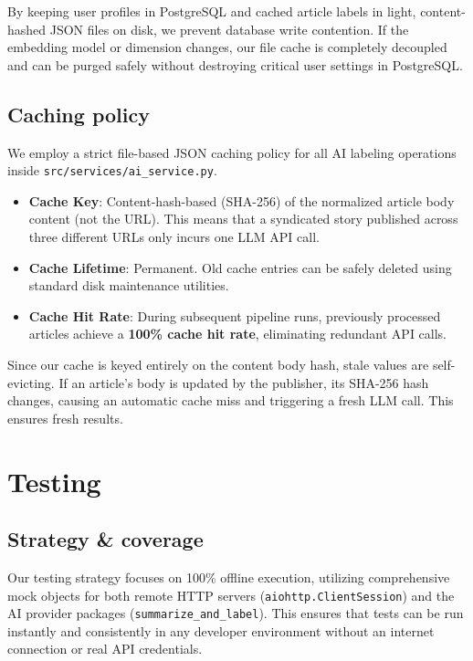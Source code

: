 \documentclass[11pt,a4paper]{article}
\begin{document}
By keeping user profiles in PostgreSQL and cached article labels in light, content-hashed JSON files on disk, we prevent database write contention. If the embedding model or dimension changes, our file cache is completely decoupled and can be purged safely without destroying critical user settings in PostgreSQL.

\subsection{Caching policy}

We employ a strict file-based JSON caching policy for all AI labeling operations inside \texttt{src/services/ai\_service.py}.
\begin{itemize}
    \item \textbf{Cache Key}: Content-hash-based (SHA-256) of the normalized article body content (not the URL). This means that a syndicated story published across three different URLs only incurs one LLM API call.
    \item \textbf{Cache Lifetime}: Permanent. Old cache entries can be safely deleted using standard disk maintenance utilities.
    \item \textbf{Cache Hit Rate}: During subsequent pipeline runs, previously processed articles achieve a \textbf{100\% cache hit rate}, eliminating redundant API calls.
\end{itemize}

Since our cache is keyed entirely on the content body hash, stale values are self-evicting. If an article's body is updated by the publisher, its SHA-256 hash changes, causing an automatic cache miss and triggering a fresh LLM call. This ensures fresh results.

\section{Testing}\label{sec:testing}

\subsection{Strategy \& coverage}

Our testing strategy focuses on 100\% offline execution, utilizing comprehensive mock objects for both remote HTTP servers (\texttt{aiohttp.ClientSession}) and the AI provider packages (\texttt{summarize\_and\_label}). This ensures that tests can be run instantly and consistently in any developer environment without an internet connection or real API credentials.
\end{document}

